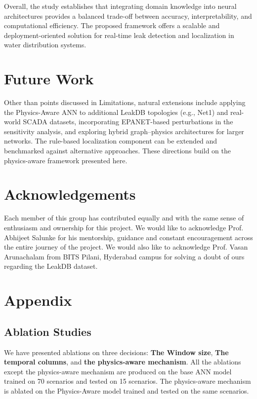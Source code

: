 \documentclass[final,5p,times,twocolumn,authoryear]{elsarticle}
\begin{document}
Overall, the study establishes that integrating domain knowledge into neural architectures provides a balanced trade-off between accuracy, interpretability, and computational efficiency. The proposed framework offers a scalable and deployment-oriented solution for real-time leak detection and localization in water distribution systems.

\section{Future Work}

Other than points discussed in Limitations, natural extensions include applying the Physics-Aware ANN to additional LeakDB topologies (e.g., Net1) and real-world SCADA datasets, incorporating EPANET-based perturbations in the sensitivity analysis, and exploring hybrid graph–physics architectures for larger networks. The rule-based localization component can be extended and benchmarked against alternative approaches. These directions build on the physics-aware framework presented here.

\section{Acknowledgements}
Each member of this group has contributed equally and with the same sense of enthusiasm and ownership for this project.
\newline We would like to acknowledge Prof. Abhijeet Salunke for his mentorship, guidance and constant encouragement across the entire journey of the project.
\newline We would also like to acknowledge Prof. Vasan Arunachalam from BITS Pilani, Hyderabad campus for solving a doubt of ours regarding the LeakDB dataset.

\section{Appendix}

\subsection{Ablation Studies}

We have presented ablations on three decisions: \textbf{The Window size}, \textbf{The temporal columns}, and \textbf{the physics-aware mechanism}. All the ablations except the physics-aware mechanism are produced on the base ANN model trained on 70 scenarios and tested on 15 scenarios. The physics-aware mechanism is ablated on the Physics-Aware model trained and tested on the same scenarios.
\end{document}
